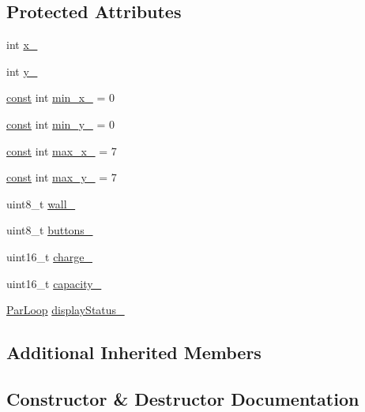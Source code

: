 \subsection*{Protected Attributes}
\begin{DoxyCompactItemize}
\item 
int \hyperlink{class_roomba_sense_h_a_t_a582d0e9fad099c1f7e0ba6a22567676e}{x\+\_\+}
\item 
int \hyperlink{class_roomba_sense_h_a_t_a3732a5d17f708fd18959beb0a4123d25}{y\+\_\+}
\item 
\hyperlink{functions__c_8js_afacfd9c985d225bb07483b887a801b6f}{const} int \hyperlink{class_roomba_sense_h_a_t_ae39e221ca1b6f9045a77d7befd66afe5}{min\+\_\+x\+\_\+} = 0
\item 
\hyperlink{functions__c_8js_afacfd9c985d225bb07483b887a801b6f}{const} int \hyperlink{class_roomba_sense_h_a_t_a121e53dc84befcf387724db98aaacf67}{min\+\_\+y\+\_\+} = 0
\item 
\hyperlink{functions__c_8js_afacfd9c985d225bb07483b887a801b6f}{const} int \hyperlink{class_roomba_sense_h_a_t_a0e74b98418deef0045f13ec563839aaa}{max\+\_\+x\+\_\+} = 7
\item 
\hyperlink{functions__c_8js_afacfd9c985d225bb07483b887a801b6f}{const} int \hyperlink{class_roomba_sense_h_a_t_ac32eb5edac9e6863af30618d5c3201e7}{max\+\_\+y\+\_\+} = 7
\item 
uint8\+\_\+t \hyperlink{class_roomba_sense_h_a_t_a51d95cef9e8394e0d2a8585daf83fc16}{wall\+\_\+}
\item 
uint8\+\_\+t \hyperlink{class_roomba_sense_h_a_t_a991284bb1f848638f47db5a823b87ef1}{buttons\+\_\+}
\item 
uint16\+\_\+t \hyperlink{class_roomba_sense_h_a_t_a7a382afdb36d1d297ca1ebc7f984db4f}{charge\+\_\+}
\item 
uint16\+\_\+t \hyperlink{class_roomba_sense_h_a_t_a2ba6d89c04f016428a23d85deb3de442}{capacity\+\_\+}
\item 
\hyperlink{class_par_loop}{Par\+Loop} \hyperlink{class_roomba_sense_h_a_t_acae6b7d45762e2159a100f78ac2250ce}{display\+Status\+\_\+}
\end{DoxyCompactItemize}
\subsection*{Additional Inherited Members}


\subsection{Constructor \& Destructor Documentation}
